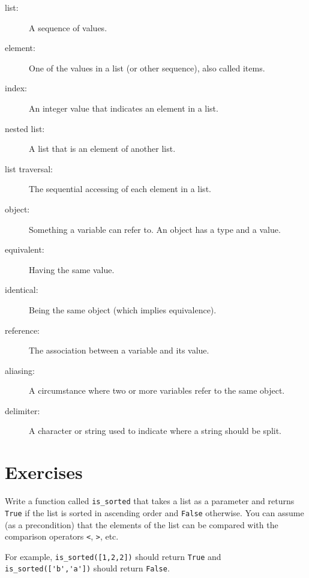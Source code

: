 \documentclass[10pt]{book}
\begin{document}
\begin{description}

\item[list:] A sequence of values.

\item[element:] One of the values in a list (or other sequence),
also called items.

\item[index:] An integer value that indicates an element in a list.

\item[nested list:] A list that is an element of another list.

\item[list traversal:] The sequential accessing of each element in a list.

\item[object:] Something a variable can refer to.  An object
has a type and a value.

\item[equivalent:] Having the same value.

\item[identical:] Being the same object (which implies equivalence).

\item[reference:] The association between a variable and its value.

\item[aliasing:] A circumstance where two or more variables refer to the same
object.

\item[delimiter:] A character or string used to indicate where a
string should be split.

\end{description}


\section{Exercises}

\begin{ex}
Write a function called \verb"is_sorted" that takes a list as a
parameter and returns {\tt True} if the list is sorted in ascending
order and {\tt False} otherwise.  You can assume (as a precondition)
that the elements of the list can be compared with the comparison
operators {\tt <}, {\tt >}, etc.


For example, \verb"is_sorted([1,2,2])" should return {\tt True}
and \verb"is_sorted(['b','a'])" should return {\tt False}.
\end{ex}
\end{document}
